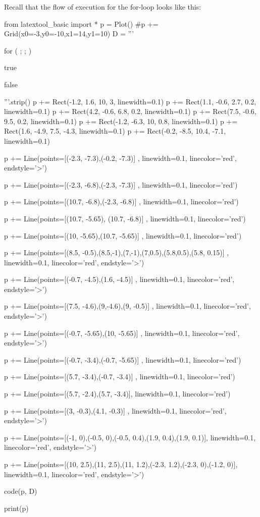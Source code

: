 Recall that the flow of execution for the for-loop looks like this:
\begin{python}
from latextool_basic import *
p = Plot()
#p += Grid(x0=-3,y0=-10,x1=14,y1=10)
D = '''





for (         ;                   ;              )








true

         

false





'''.strip()
p += Rect(-1.2, 1.6, 10, 3, linewidth=0.1)
p += Rect(1.1, -0.6, 2.7, 0.2, linewidth=0.1)
p += Rect(4.2, -0.6, 6.8, 0.2, linewidth=0.1)
p += Rect(7.5, -0.6, 9.5, 0.2, linewidth=0.1)
p += Rect(-1.2, -6.3, 10, 0.8, linewidth=0.1)
p += Rect(1.6, -4.9, 7.5, -4.3, linewidth=0.1)
p += Rect(-0.2, -8.5, 10.4, -7.1, linewidth=0.1)

p += Line(points=[(-2.3, -7.3),(-0.2, -7.3)] , linewidth=0.1, linecolor='red', endstyle='>')

p += Line(points=[(-2.3, -6.8),(-2.3, -7.3)] , linewidth=0.1, linecolor='red')

p += Line(points=[(10.7, -6.8),(-2.3, -6.8)] , linewidth=0.1, linecolor='red')

p += Line(points=[(10.7, -5.65), (10.7, -6.8)] , linewidth=0.1, linecolor='red')

p += Line(points=[(10, -5.65),(10.7, -5.65)] , linewidth=0.1, linecolor='red')

p += Line(points=[(8.5, -0.5),(8.5,-1),(7,-1),(7,0.5),(5.8,0.5),(5.8, 0.15)] , linewidth=0.1, linecolor='red', endstyle='>')

p += Line(points=[(-0.7, -4.5),(1.6, -4.5)] , linewidth=0.1, linecolor='red', endstyle='>')

p += Line(points=[(7.5, -4.6),(9,-4.6),(9, -0.5)] , linewidth=0.1, linecolor='red', endstyle='>')

p += Line(points=[(-0.7, -5.65),(10, -5.65)] , linewidth=0.1, linecolor='red', endstyle='>')

p += Line(points=[(-0.7, -3.4),(-0.7, -5.65)] , linewidth=0.1, linecolor='red')

p += Line(points=[(5.7, -3.4),(-0.7, -3.4)] , linewidth=0.1, linecolor='red')

p += Line(points=[(5.7, -2.4),(5.7, -3.4)], linewidth=0.1, linecolor='red')

p += Line(points=[(3, -0.3),(4.1, -0.3)] , linewidth=0.1, linecolor='red', endstyle='>')

p += Line(points=[(-1, 0),(-0.5, 0),(-0.5, 0.4),(1.9, 0.4),(1.9, 0.1)], linewidth=0.1, linecolor='red', endstyle='>')

p += Line(points=[(10, 2.5),(11, 2.5),(11, 1.2),(-2.3, 1.2),(-2.3, 0),(-1.2, 0)], linewidth=0.1, linecolor='red', endstyle='>')


code(p, D)

print(p)
\end{python}

